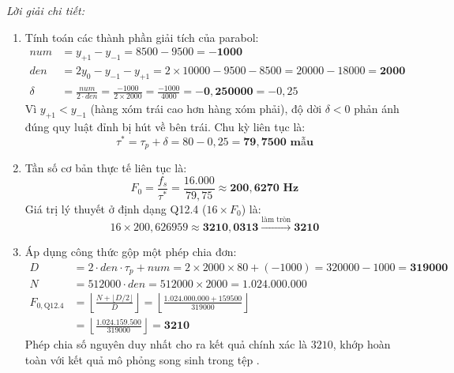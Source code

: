 \emph{Lời giải chi tiết:}
\begin{enumerate}[label=(\alph*), leftmargin=1.5em, itemsep=2pt]
    \item Tính toán các thành phần giải tích của parabol:
    \begin{align}
    num &= y_{+1} - y_{-1} = 8500 - 9500 = \mathbf{-1000} \\
    den &= 2y_0 - y_{-1} - y_{+1} = 2 \times 10000 - 9500 - 8500 = 20000 - 18000 = \mathbf{2000} \\
    \delta &= \frac{num}{2 \cdot den} = \frac{-1000}{2 \times 2000} = \frac{-1000}{4000} = \mathbf{-0{,}250000} = -0{,}25
    \end{align}
    Vì $y_{+1} < y_{-1}$ (hàng xóm trái cao hơn hàng xóm phải), độ dời $\delta < 0$ phản ánh đúng quy luật đỉnh bị hút về bên trái. Chu kỳ liên tục là:
    \begin{equation}
    \tau^* = \tau_p + \delta = 80 - 0{,}25 = \mathbf{79{,}7500\text{ mẫu}}
    \end{equation}
    \item Tần số cơ bản thực tế liên tục là:
    \begin{equation}
    F_0 = \frac{f_s}{\tau^*} = \frac{16.000}{79{,}75} \approx \mathbf{200{,}6270\text{ Hz}}
    \end{equation}
    Giá trị lý thuyết ở định dạng Q12.4 ($16 \times F_0$) là:
    \begin{equation}
    16 \times 200{,}626959 \approx \mathbf{3210{,}0313} \xrightarrow{\text{làm tròn}} \mathbf{3210}
    \end{equation}
    \item Áp dụng công thức gộp một phép chia đơn:
    \begin{align}
    D &= 2 \cdot den \cdot \tau_p + num = 2 \times 2000 \times 80 + (-1000) = 320000 - 1000 = \mathbf{319000} \\
    N &= 512000 \cdot den = 512000 \times 2000 = \mathbf{1.024.000.000} \\
    F_{0, \text{Q12.4}} &= \left\lfloor \frac{N + \lfloor D / 2 \rfloor}{D} \right\rfloor = \left\lfloor \frac{1.024.000.000 + 159500}{319000} \right\rfloor \\
    &= \left\lfloor \frac{1.024.159.500}{319000} \right\rfloor = \mathbf{3210}
    \end{align}
    Phép chia số nguyên duy nhất cho ra kết quả chính xác là $3210$, khớp hoàn toàn với kết quả mô phỏng song sinh trong tệp .
\end{enumerate}

